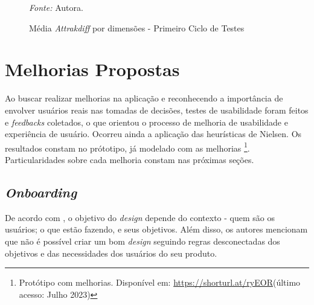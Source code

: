 \begin{figure}[h!]
	\centering
	\caption{Média \textit{Attrakdiff} por dimensões - Primeiro Ciclo de Testes}
	\begin{tablenotes}[flushleft]
		\centering
		\item \textit{Fonte:} Autora.
	\end{tablenotes}
	\label{fig21}
\end{figure}

\section{Melhorias Propostas}
\label{sec:Melhorias Propostas}
Ao buscar realizar melhorias na aplicação e reconhecendo a importância de envolver usuários reais nas tomadas de decisões, testes de usabilidade foram feitos e \textit{feedbacks} coletados, 
o que orientou o processo de melhoria de usabilidade e experiência de usuário. Ocorreu ainda a aplicação das heurísticas de Nielsen. Os resultados constam no prótotipo, já modelado com as melhorias
\footnote{Protótipo com melhorias. Disponível em: \url{https://shorturl.at/ryEOR}(último acesso: Julho 2023)}. Particularidades sobre cada melhoria constam nas próximas seções.

\subsection{\textit{Onboarding}}
\label{sec:Onboarding}
De acordo com , o objetivo do \textit{design} depende do contexto - quem são os usuários; o que estão fazendo, e seus objetivos. Além disso, os autores mencionam que não é possível 
criar um bom \textit{design} seguindo regras desconectadas dos objetivos e das necessidades dos usuários do seu produto. 


